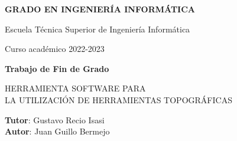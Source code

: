 \thispagestyle{empty}
\vspace{2cm}

\begin{figure}[htb]
  \centerline{}
\end{figure}

\begin{center}
  {\Large {\bf GRADO EN INGENIERÍA INFORMÁTICA}}
  \vspace{5mm}
 
  {\large {Escuela Técnica Superior de Ingeniería Informática}}
  \vspace{5mm}

  {\large {Curso académico 2022-2023}}

  \vspace{1cm}

  {\large {\bf Trabajo de Fin de Grado}}

  \vspace{2cm}

  {\Large {HERRAMIENTA SOFTWARE PARA \\
  LA UTILIZACIÓN DE HERRAMIENTAS TOPOGRÁFICAS\\[1cm] }}

  \vspace{5cm}
  {\bf Tutor}: Gustavo Recio Isasi \\
  {\bf Autor}: Juan Guillo Bermejo
\end{center}

\clearpage
\thispagestyle{empty}
